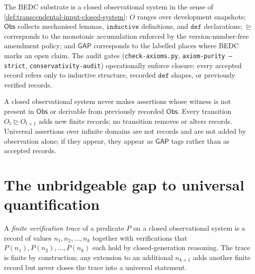 \begin{example}
\label{ex:transcendental-input-bedc-canonical}
The BEDC substrate is a closed observational system in the sense of \autoref{def:transcendental-input-closed-system}: $O$ ranges over development snapshots; $\mathsf{Obs}$ collects mechanised lemmas, $\texttt{inductive}$ definitions, and $\texttt{def}$ declarations; $\trianglerighteq$ corresponds to the monotonic accumulation enforced by the version-number-free amendment policy; and $\mathsf{GAP}$ corresponds to the labelled places where BEDC marks an open claim. The audit gates (\texttt{check-axioms.py}, \texttt{axiom-purity --strict}, \texttt{conservativity-audit}) operationally enforce closure: every accepted record refers only to inductive structure, recorded $\texttt{def}$ shapes, or previously verified records.
\end{example}

\begin{principle}
\label{prin:transcendental-input-conservation}
A closed observational system never makes assertions whose witness is not present in $\mathsf{Obs}$ or derivable from previously recorded $\mathsf{Obs}$. Every transition $O_t \trianglerighteq O_{t+1}$ adds new finite records; no transition removes or alters records. Universal assertions over infinite domains are not records and are not added by observation alone; if they appear, they appear as $\mathsf{GAP}$ tags rather than as accepted records.
\end{principle}

\section{The unbridgeable gap to universal quantification}
\label{sec:transcendental-input-unbridgeable-gap}

\begin{definition}
\label{def:transcendental-input-finite-trace}
A \emph{finite verification trace} of a predicate $P$ on a closed observational system is a record of values $n_1, n_2, \ldots, n_k$ together with verifications that $P(n_1), P(n_2), \ldots, P(n_k)$ each hold by closed-generation reasoning. The trace is finite by construction; any extension to an additional $n_{k+1}$ adds another finite record but never closes the trace into a universal statement.
\end{definition}

